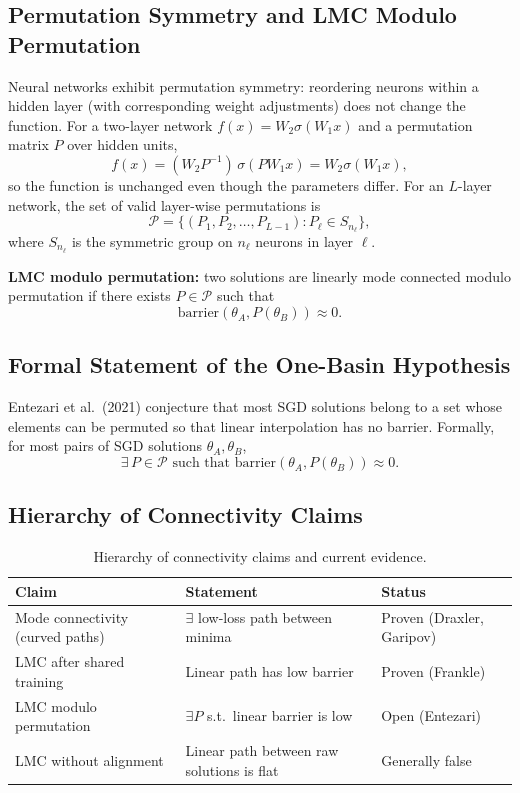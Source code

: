 \documentclass[11pt,a4paper]{article}
\begin{document}
\subsection{Permutation Symmetry and LMC Modulo Permutation}

Neural networks exhibit permutation symmetry: reordering neurons within a hidden layer (with corresponding weight adjustments) does not change the function. For a two-layer network $f(x) = W_2 \sigma(W_1 x)$ and a permutation matrix $P$ over hidden units,
\[
f(x) = (W_2 P^{-1})\, \sigma(P W_1 x) = W_2 \sigma(W_1 x),
\]
so the function is unchanged even though the parameters differ. For an $L$-layer network, the set of valid layer-wise permutations is
\[
\mathcal{P} = \{(P_1, P_2, \ldots, P_{L-1}) : P_\ell \in S_{n_\ell}\},
\]
where $S_{n_\ell}$ is the symmetric group on $n_\ell$ neurons in layer $\ell$.

\textbf{LMC modulo permutation:} two solutions are linearly mode connected modulo permutation if there exists $P \in \mathcal{P}$ such that
\[
\text{barrier}(\theta_A, P(\theta_B)) \approx 0.
\]

\subsection{Formal Statement of the One-Basin Hypothesis}

Entezari et al.\ (2021) conjecture that most SGD solutions belong to a set whose elements can be permuted so that linear interpolation has no barrier. Formally, for most pairs of SGD solutions $\theta_A, \theta_B$,
\[
\exists\, P \in \mathcal{P} \text{ such that } \text{barrier}(\theta_A, P(\theta_B)) \approx 0.
\]

\subsection{Hierarchy of Connectivity Claims}

\begin{table}[H]
    \centering
    \caption{Hierarchy of connectivity claims and current evidence.}
    \begin{tabular}{l l l}
        \toprule
        \textbf{Claim} & \textbf{Statement} & \textbf{Status} \\
        \midrule
        Mode connectivity (curved paths) & $\exists$ low-loss path between minima & Proven (Draxler, Garipov) \\
        LMC after shared training & Linear path has low barrier & Proven (Frankle) \\
        LMC modulo permutation & $\exists P$ s.t.\ linear barrier is low & Open (Entezari) \\
        LMC without alignment & Linear path between raw solutions is flat & Generally false \\
        \bottomrule
    \end{tabular}
\end{table}
\end{document}
